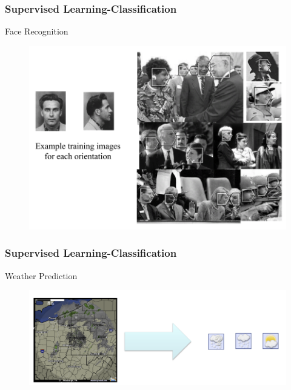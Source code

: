 \documentclass[9pt]{beamer}
\begin{document}
\begin{CJK*}{GBK}{kai}
\begin{frame}
\end{frame}
\begin{frame}
	\frametitle{Supervised Learning-Classification}
	\begin{block}{Face Recognition}
		\begin{figure}[h]
			\centering
			\includegraphics[scale=0.3]{FaceReco.png}
			
		\end{figure}
	\end{block}
\end{frame}
\begin{frame}
	\frametitle{Supervised Learning-Classification}
	\begin{block}{Weather Prediction}
		\begin{figure}[h]
			\centering
			\includegraphics[scale=0.3]{WeatherPredict.png}
			

\end{figure}
\end{block}
\end{frame}
\end{CJK*}
\end{document}
